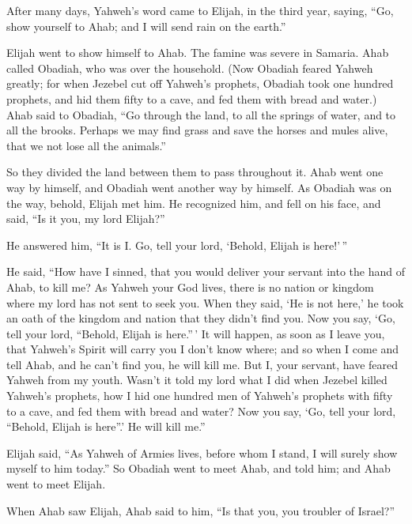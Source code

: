  After many days, Yahweh's word came to Elijah, in the
third year, saying, ``Go, show yourself to Ahab; and I will send rain on
the earth.''

 Elijah went to show himself to Ahab. The famine was
severe in Samaria.  Ahab called Obadiah, who was over the
household. (Now Obadiah feared Yahweh greatly;  for when
Jezebel cut off Yahweh's prophets, Obadiah took one hundred prophets,
and hid them fifty to a cave, and fed them with bread and water.)
 Ahab said to Obadiah, ``Go through the land, to all the
springs of water, and to all the brooks. Perhaps we may find grass and
save the horses and mules alive, that we not lose all the animals.''

 So they divided the land between them to pass throughout
it. Ahab went one way by himself, and Obadiah went another way by
himself.  As Obadiah was on the way, behold, Elijah met
him. He recognized him, and fell on his face, and said, ``Is it you, my
lord Elijah?''

 He answered him, ``It is I. Go, tell your lord, `Behold,
Elijah is here!'\,''

 He said, ``How have I sinned, that you would deliver your
servant into the hand of Ahab, to kill me?  As Yahweh
your God lives, there is no nation or kingdom where my lord has not sent
to seek you. When they said, `He is not here,' he took an oath of the
kingdom and nation that they didn't find you.  Now you
say, `Go, tell your lord, ``Behold, Elijah is here.''\,' 
It will happen, as soon as I leave you, that Yahweh's Spirit will carry
you I don't know where; and so when I come and tell Ahab, and he can't
find you, he will kill me. But I, your servant, have feared Yahweh from
my youth.  Wasn't it told my lord what I did when Jezebel
killed Yahweh's prophets, how I hid one hundred men of Yahweh's prophets
with fifty to a cave, and fed them with bread and water? 
Now you say, `Go, tell your lord, ``Behold, Elijah is here''.' He will
kill me.''

 Elijah said, ``As Yahweh of Armies lives, before whom I
stand, I will surely show myself to him today.''  So
Obadiah went to meet Ahab, and told him; and Ahab went to meet Elijah.

 When Ahab saw Elijah, Ahab said to him, ``Is that you,
you troubler of Israel?''


